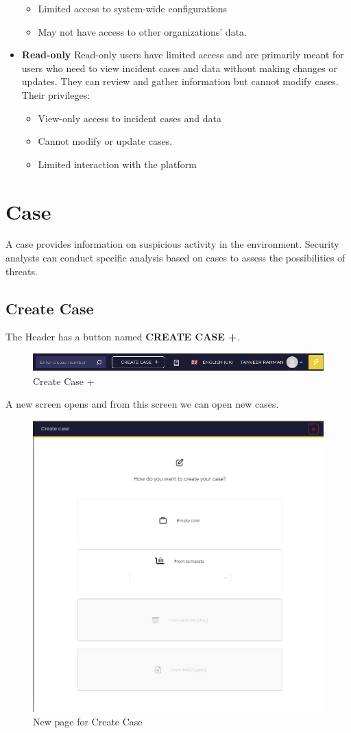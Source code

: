 \documentclass{book}
\begin{document}
\begin{itemize}
\begin{itemize}
            \item Limited access to system-wide configurations
            \item May not have access to other organizations’ data.
        \end{itemize}
    \item \textbf{Read-only} Read-only users have limited access and are primarily meant for users who need to view incident cases and data without making changes or updates. They can review and gather information but cannot modify cases. Their privileges:
        \begin{itemize}
            \item View-only access to incident cases and data
            \item Cannot modify or update cases.
            \item Limited interaction with the platform
        \end{itemize}
\end{itemize}





\chapter{Case}
A case provides information on suspicious activity in the environment. Security analysts can conduct specific analysis based on cases to assess the possibilities of threats. 

\section{Create Case}
The Header has a button named \textbf{CREATE CASE +}. 
\begin{figure}[h]
    \centering
    \includegraphics[width=0.8\linewidth]{Case_images/createcase+.png}
    \caption{Create Case +}
    \label{fig:createcasebutton}
\end{figure}

A new screen opens and from this screen we can open new cases.
\begin{figure}[h]
    \centering
    \includegraphics[width=0.5\linewidth]{Case_images/createcaseoverlay.png}
    \caption{New page for Create Case}
    \label{fig:createcaseoverlay}
\end{figure}
\end{document}
